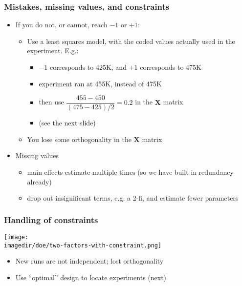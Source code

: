 \begin{frame}\frametitle{Mistakes, missing values, and constraints}
	\begin{itemize}
		\item	If you do not, or cannot, reach $-1$ or $+1$:
		\begin{itemize}
			\item	Use a least squares model, with the coded values actually used in the experiment. E.g.:
			\begin{itemize}
				\item	$-1$ corresponds to 425K, and $+1$ corresponds to 475K
				\item	experiment ran at 455K, instead of 475K 
				\item	then use $\dfrac{455 - 450}{(475 - 425)/2} = 0.2$ in the $\mathbf{X}$ matrix
				\item	(see the next slide)
			\end{itemize}
			\item	You lose some orthogonality in the $\mathbf{X}$ matrix
		\end{itemize}
	\end{itemize}
	\begin{itemize}
		\item	Missing values
		\begin{itemize}
			\item	main effects estimate multiple times (so we have built-in redundancy already)
			\item	drop out insignificant terms, e.g. a 2-fi, and estimate fewer parameters
		\end{itemize}
	\end{itemize}
\end{frame}

\begin{frame}\frametitle{Handling of constraints}
	\begin{center}
		\texttt{[image: \\imagedir/doe/two-factors-with-constraint.png]}
	\end{center}
	\begin{itemize}
		\item	New runs are not independent; lost orthogonality
		\item	Use ``optimal'' design to locate experiments (next)
	\end{itemize}
\end{frame}

